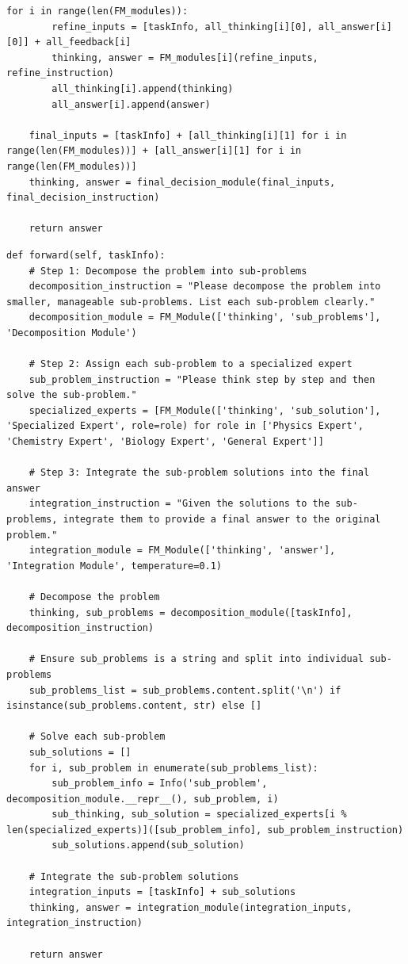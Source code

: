 \documentclass{article} %
\begin{document}
\begin{lstlisting}[style=pythonstyle, caption={Example discovered agent: Multi-Step Peer Review Agent}]
    for i in range(len(FM_modules)):
        refine_inputs = [taskInfo, all_thinking[i][0], all_answer[i][0]] + all_feedback[i]
        thinking, answer = FM_modules[i](refine_inputs, refine_instruction)
        all_thinking[i].append(thinking)
        all_answer[i].append(answer)

    final_inputs = [taskInfo] + [all_thinking[i][1] for i in range(len(FM_modules))] + [all_answer[i][1] for i in range(len(FM_modules))]
    thinking, answer = final_decision_module(final_inputs, final_decision_instruction)

    return answer
\end{lstlisting}


\begin{lstlisting}[style=pythonstyle, caption={Example discovered agent: Divide and Conquer Agent}]
def forward(self, taskInfo):
    # Step 1: Decompose the problem into sub-problems
    decomposition_instruction = "Please decompose the problem into smaller, manageable sub-problems. List each sub-problem clearly."
    decomposition_module = FM_Module(['thinking', 'sub_problems'], 'Decomposition Module')

    # Step 2: Assign each sub-problem to a specialized expert
    sub_problem_instruction = "Please think step by step and then solve the sub-problem."
    specialized_experts = [FM_Module(['thinking', 'sub_solution'], 'Specialized Expert', role=role) for role in ['Physics Expert', 'Chemistry Expert', 'Biology Expert', 'General Expert']]

    # Step 3: Integrate the sub-problem solutions into the final answer
    integration_instruction = "Given the solutions to the sub-problems, integrate them to provide a final answer to the original problem."
    integration_module = FM_Module(['thinking', 'answer'], 'Integration Module', temperature=0.1)

    # Decompose the problem
    thinking, sub_problems = decomposition_module([taskInfo], decomposition_instruction)

    # Ensure sub_problems is a string and split into individual sub-problems
    sub_problems_list = sub_problems.content.split('\n') if isinstance(sub_problems.content, str) else []

    # Solve each sub-problem
    sub_solutions = []
    for i, sub_problem in enumerate(sub_problems_list):
        sub_problem_info = Info('sub_problem', decomposition_module.__repr__(), sub_problem, i)
        sub_thinking, sub_solution = specialized_experts[i % len(specialized_experts)]([sub_problem_info], sub_problem_instruction)
        sub_solutions.append(sub_solution)

    # Integrate the sub-problem solutions
    integration_inputs = [taskInfo] + sub_solutions
    thinking, answer = integration_module(integration_inputs, integration_instruction)

    return answer
\end{lstlisting}
\end{document}
